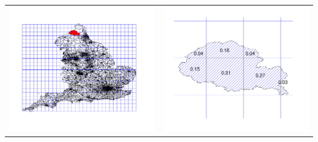 \documentclass[slidestop,compress,serif,10pt]{beamer}
\begin{document}
\begin{frame}
\begin{itemize}
\begin{center}
\begin{tabular}{ll}
\hspace{-1cm}\includegraphics[scale=.15]{MSOA_grid.pdf} &\hspace{-0.75cm}\includegraphics[scale=.18]{Zoom_grid.pdf}
\end{tabular}
\end{center}
\end{itemize}

\end{frame}
\end{document}
